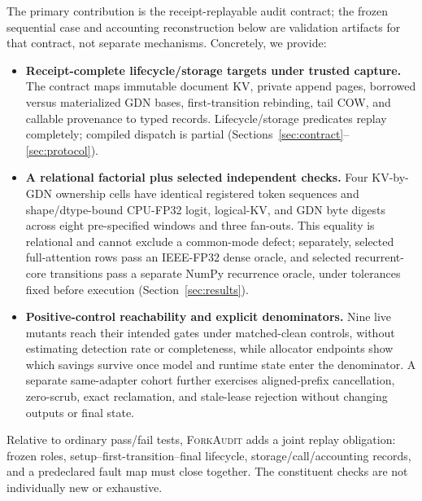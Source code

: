 \documentclass{article}
\newcommand{\method}{\textsc{ForkAudit}}
\begin{document}
The primary contribution is the receipt-replayable audit contract; the frozen sequential case and
accounting reconstruction below are validation artifacts for that contract,
not separate mechanisms.  Concretely, we provide:
\begin{itemize}
  \item \textbf{Receipt-complete lifecycle/storage targets under trusted capture.}
  The contract maps immutable
  document KV, private append pages, borrowed versus materialized GDN bases,
  first-transition rebinding, tail COW, and callable provenance to typed
  records.  Lifecycle/storage predicates replay completely; compiled dispatch
  is partial (Sections~\ref{sec:contract}--\ref{sec:protocol}).
  \item \textbf{A relational factorial plus selected independent checks.}  Four
  KV-by-GDN ownership cells have identical registered token sequences and
  shape/dtype-bound CPU-FP32 logit, logical-KV, and GDN byte digests across
  eight pre-specified windows and three fan-outs.  This equality is relational
  and cannot exclude a common-mode defect; separately, selected full-attention rows
  pass an IEEE-FP32 dense oracle, and
  selected recurrent-core transitions pass a separate NumPy recurrence oracle,
  under tolerances fixed before execution (Section~\ref{sec:results}).
  \item \textbf{Positive-control reachability and explicit denominators.}  Nine
  live mutants reach their intended gates under matched-clean controls, without
  estimating detection rate or completeness, while
  allocator endpoints show which savings survive once model and runtime state
  enter the denominator.  A separate same-adapter cohort further exercises
  aligned-prefix cancellation, zero-scrub, exact reclamation, and stale-lease
  rejection without changing outputs or final state.
\end{itemize}

Relative to ordinary pass/fail tests, \method{} adds a joint replay
obligation: frozen roles, setup--first-transition--final lifecycle,
storage/call/accounting records, and a predeclared fault map must close
together.  The constituent checks are not individually new or exhaustive.
\end{document}
